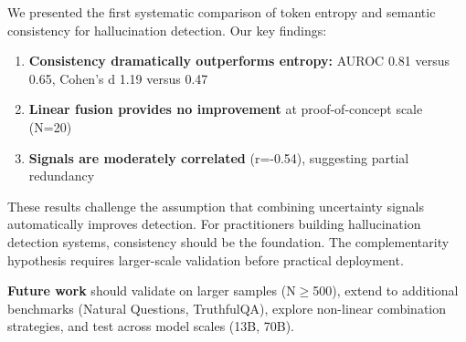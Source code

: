 We presented the first systematic comparison of token entropy and semantic consistency for hallucination detection. Our key findings:

\begin{enumerate}
    \item \textbf{Consistency dramatically outperforms entropy:} AUROC 0.81 versus 0.65, Cohen's d 1.19 versus 0.47
    \item \textbf{Linear fusion provides no improvement} at proof-of-concept scale (N=20)
    \item \textbf{Signals are moderately correlated} (r=-0.54), suggesting partial redundancy
\end{enumerate}

These results challenge the assumption that combining uncertainty signals automatically improves detection. For practitioners building hallucination detection systems, consistency should be the foundation. The complementarity hypothesis requires larger-scale validation before practical deployment.

\textbf{Future work} should validate on larger samples (N$\geq$500), extend to additional benchmarks (Natural Questions, TruthfulQA), explore non-linear combination strategies, and test across model scales (13B, 70B).
